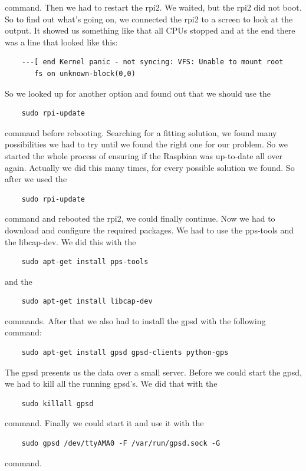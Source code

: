 command. Then we had to restart the \gls{rpi2}. We waited, but the \gls{rpi2} did not boot. So to find out what's going on, we connected the \gls{rpi2} to a screen to look at the output. It showed us something like that all CPUs stopped and at the end there was a line that looked like this:
\begin{verbatim}
	---[ end Kernel panic - not syncing: VFS: Unable to mount root 
	   fs on unknown-block(0,0)
\end{verbatim}
So we looked up for another option and found out that we should  use the 
\begin{verbatim}
	sudo rpi-update
\end{verbatim}
command before rebooting. Searching for a fitting solution, we found many possibilities we had to try until we found the right one for our problem. So we started the whole process of ensuring if the Raspbian was up-to-date all over again. Actually we did this many times, for every possible solution we found.\newline
So after we used the 
\begin{verbatim}
	sudo rpi-update
\end{verbatim} 
command and rebooted the \gls{rpi2}, we could finally continue.\newline
Now we had to download and configure the required packages. We had to use the pps-tools and the libcap-dev. We did this with the 
\begin{verbatim}
	sudo apt-get install pps-tools
\end{verbatim}
and the 
\begin{verbatim}
	sudo apt-get install libcap-dev
\end{verbatim}
commands.\newline
After that we also had to install the \gls{gpsd} with the following command:
\begin{verbatim}
	sudo apt-get install gpsd gpsd-clients python-gps
\end{verbatim}
The \gls{gpsd} presents us the data over a small server.\newline
Before we could start the \gls{gpsd}, we had to kill all the running \gls{gpsd}'s. We did that with the 
\begin{verbatim}
	sudo killall gpsd 
\end{verbatim}
command. Finally we could start it and use it with the 
\begin{verbatim}
	sudo gpsd /dev/ttyAMA0 -F /var/run/gpsd.sock -G
\end{verbatim}
command.
